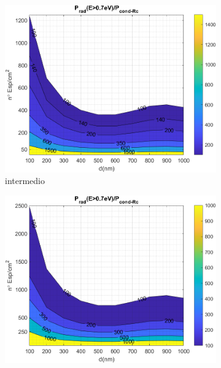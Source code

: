 \begin{figure}[H]
	\centering
	\begin{subfigure}[b]{0.49\textwidth}
		\centering
		\includegraphics[width=1.00\textwidth]{figuras/Resultados/RelacionCondRad/SS_Rc_Intermedio_100.png}
		\caption{intermedio }
		\label{fig:rel_SsSiO2Ge_Rc_inter_100}
	\end{subfigure}
	\hfill
	\begin{subfigure}[b]{0.49\textwidth}
		\centering
		\includegraphics[width=1.00\textwidth]{figuras/Resultados/RelacionCondRad/SS_Rc_100s.png}
		\caption{ }
		\label{fig:rel_SsSiO2Ge_Rc_max_100}
	\end{subfigure}
	\caption{ }
	\label{fig:rel_SsSiO2Ge_100}
\end{figure}
